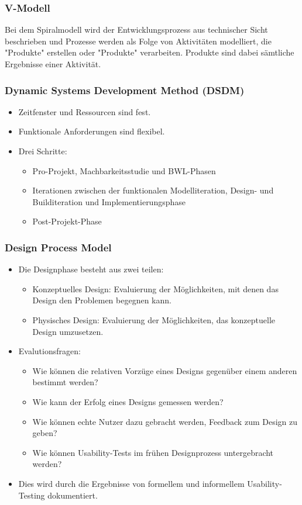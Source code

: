 			\subsubsection{V-Modell}
				Bei dem Spiralmodell wird der Entwicklungsprozess aus technischer Sicht beschrieben und Prozesse werden als Folge von Aktivitäten modelliert, die "Produkte" erstellen oder "Produkte" verarbeiten. Produkte sind dabei sämtliche Ergebnisse einer Aktivität.

			\subsubsection{Dynamic Systems Development Method (DSDM)}
				\begin{itemize}
					\item Zeitfenster und Ressourcen sind fest.
					\item Funktionale Anforderungen sind flexibel.
					\item Drei Schritte:
						\begin{itemize}
							\item Pro-Projekt, Machbarkeitsstudie und BWL-Phasen
							\item Iterationen zwischen der funktionalen Modelliteration, Design- und Builditeration und Implementierungsphase
							\item Post-Projekt-Phase
						\end{itemize}
				\end{itemize}

			\subsubsection{Design Process Model}
				\begin{itemize}
					\item Die Designphase besteht aus zwei teilen:
						\begin{itemize}
							\item Konzeptuelles Design: Evaluierung der Möglichkeiten, mit denen das Design den Problemen begegnen kann.
							\item Physisches Design: Evaluierung der Möglichkeiten, das konzeptuelle Design umzusetzen.
						\end{itemize}
					\item Evalutionsfragen:
						\begin{itemize}
							\item Wie können die relativen Vorzüge eines Designs gegenüber einem anderen bestimmt werden?
							\item Wie kann der Erfolg eines Designs gemessen werden?
							\item Wie können echte Nutzer dazu gebracht werden, Feedback zum Design zu geben?
							\item Wie können Usability-Tests im frühen Designprozess untergebracht werden?
						\end{itemize}
					\item Dies wird durch die Ergebnisse von formellem und informellem Usability-Testing dokumentiert.
				\end{itemize}

